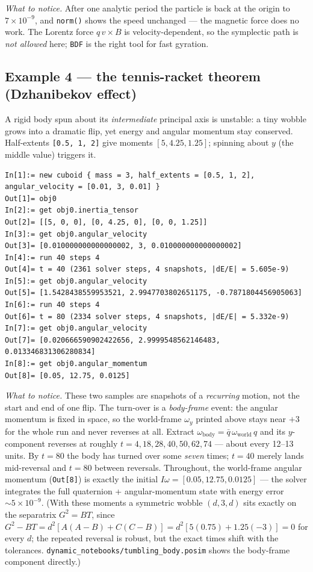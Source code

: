 \documentclass[11pt]{article}
\newcommand{\kw}[1]{\texttt{\uppercase{#1}}}
\newcommand{\code}[1]{\texttt{#1}}
\begin{document}
\emph{What to notice.} After one analytic period the particle is back at
the origin to $7\times10^{-9}$, and \code{norm()} shows the speed
unchanged --- the magnetic force does no work. The Lorentz force
$q\,v\times B$ is velocity-dependent, so the symplectic path is
\emph{not allowed} here; \kw{bdf} is the right tool for fast gyration.

\subsection{Example 4 --- the tennis-racket theorem (Dzhanibekov effect)}

A rigid body spun about its \emph{intermediate} principal axis is
unstable: a tiny wobble grows into a dramatic flip, yet energy and
angular momentum stay conserved. Half-extents \code{[0.5, 1, 2]} give
moments $[5, 4.25, 1.25]$; spinning about $y$ (the middle value)
triggers it.

\begin{lstlisting}
In[1]:= new cuboid { mass = 3, half_extents = [0.5, 1, 2], angular_velocity = [0.01, 3, 0.01] }
Out[1]= obj0
In[2]:= get obj0.inertia_tensor
Out[2]= [[5, 0, 0], [0, 4.25, 0], [0, 0, 1.25]]
In[3]:= get obj0.angular_velocity
Out[3]= [0.010000000000000002, 3, 0.010000000000000002]
In[4]:= run 40 steps 4
Out[4]= t = 40 (2361 solver steps, 4 snapshots, |dE/E| = 5.605e-9)
In[5]:= get obj0.angular_velocity
Out[5]= [1.5428438559953521, 2.9947703802651175, -0.7871804456905063]
In[6]:= run 40 steps 4
Out[6]= t = 80 (2334 solver steps, 4 snapshots, |dE/E| = 5.332e-9)
In[7]:= get obj0.angular_velocity
Out[7]= [0.020666590902422656, 2.9999548562146483, 0.013346831306280834]
In[8]:= get obj0.angular_momentum
Out[8]= [0.05, 12.75, 0.0125]
\end{lstlisting}

\emph{What to notice.} These two samples are snapshots of a
\emph{recurring} motion, not the start and end of one flip. The
turn-over is a \emph{body-frame} event: the angular momentum is fixed in
space, so the world-frame $\omega_y$ printed above stays near $+3$ for
the whole run and never reverses at all. Extract
$\omega_{\text{body}} = \bar{q}\,\omega_{\text{world}}\,q$ and its
$y$-component reverses at roughly $t = 4, 18, 28, 40, 50, 62, 74$ ---
about every 12--13 units. By $t=80$ the body has turned over some
\emph{seven} times; $t=40$ merely lands mid-reversal and $t=80$ between
reversals. Throughout, the world-frame angular momentum
(\code{Out[8]}) is exactly the initial
$I\omega = [0.05, 12.75, 0.0125]$ --- the solver integrates the full
quaternion + angular-momentum state with energy error
$\sim 5\times10^{-9}$. (With these moments a symmetric wobble
$(d, 3, d)$ sits exactly on the separatrix $G^2 = BT$, since
$G^2 - BT = d^2[A(A-B) + C(C-B)] = d^2[5(0.75) + 1.25(-3)] = 0$ for
every $d$; the repeated reversal is robust, but the exact times shift
with the tolerances. \code{dynamic\_notebooks/tumbling\_body.posim}
shows the body-frame component directly.)
\end{document}
